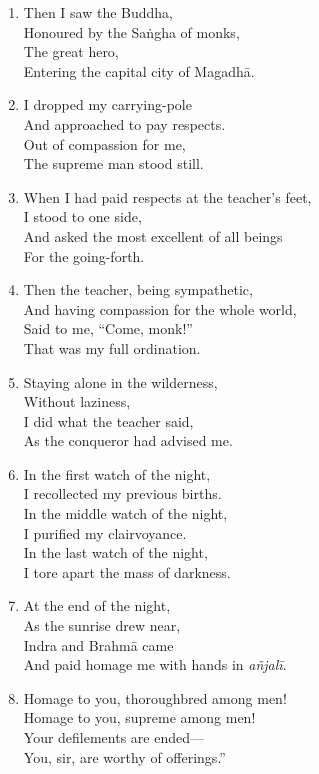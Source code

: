 \documentclass[10pt, openany]{book}
\newcommand*{\vleftofline}[1]{\leavevmode\llap{#1}}
\begin{document}
\begin{enumerate}
\item Then I saw the Buddha,\\
Honoured by the Saṅgha of monks,\\
The great hero,\\
Entering the capital city of Magadhā.

\item I dropped my carrying-pole\\
And approached to pay respects.\\
Out of compassion for me,\\
The supreme man stood still.

\item When I had paid respects at the teacher’s feet,\\
I stood to one side,\\
And asked the most excellent of all beings\\
For the going-forth.

\item Then the teacher, being sympathetic,\\
And having compassion for the whole world,\\
Said to me, “Come, monk!”\\
That was my full ordination.

\item Staying alone in the wilderness,\\
Without laziness,\\
I did what the teacher said,\\
As the conqueror had advised me.

\item In the first watch of the night,\\
I recollected my previous births.\\
In the middle watch of the night,\\
I purified my clairvoyance.\\
In the last watch of the night,\\
I tore apart the mass of darkness.

\item At the end of the night,\\
As the sunrise drew near,\\
Indra and Brahmā came\\
And paid homage me with hands in \emph{añjalī}.

\item \vleftofline{“}Homage to you, thoroughbred among men!\\
Homage to you, supreme among men!\\
Your defilements are ended—\\
You, sir, are worthy of offerings.”


\end{enumerate}
\end{document}
